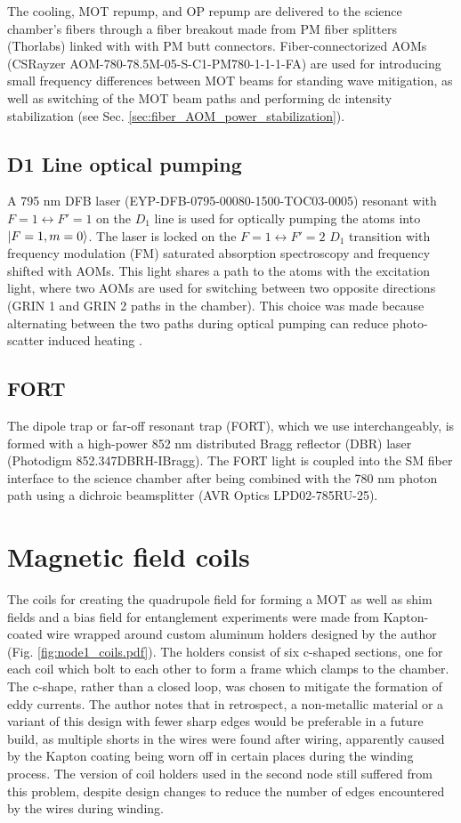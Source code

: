 The cooling, MOT repump, and OP repump are delivered to the science chamber's fibers through a fiber breakout made from PM fiber splitters (Thorlabs) linked with with PM butt connectors. Fiber-connectorized AOMs (CSRayzer AOM-780-78.5M-05-S-C1-PM780-1-1-1-FA) are used for introducing small frequency differences between MOT beams for standing wave mitigation, as well as switching of the MOT beam paths and performing dc intensity stabilization (see Sec. \ref{sec:fiber_AOM_power_stabilization}). 

\subsection{D1 Line optical pumping}

A 795 nm DFB laser (EYP-DFB-0795-00080-1500-TOC03-0005) resonant with $F=1 \leftrightarrow F'=1$ on the $D_1$ line is used for optically pumping the atoms into $\ket{F=1, m=0}$. The laser is locked on the $F=1 \leftrightarrow F'=2$ $D_1$ transition with frequency modulation (FM) saturated absorption spectroscopy and frequency shifted with AOMs. This light shares a path to the atoms with the excitation light, where two AOMs are used for switching between two opposite directions (GRIN 1 and GRIN 2 paths in the chamber). This choice was made  because alternating between the two paths during optical pumping can reduce photo-scatter induced heating \cite{su2024fast}.

\subsection{FORT}
The dipole trap or far-off resonant trap (FORT), which we use interchangeably, is formed with a high-power 852 nm distributed Bragg reflector (DBR) laser (Photodigm 852.347DBRH-IBragg). The FORT light is coupled into the SM fiber interface to the science chamber after being combined with the 780 nm photon path using a dichroic beamsplitter (AVR Optics LPD02-785RU-25).  

\section{Magnetic field coils}
The coils for creating the quadrupole field for forming a MOT as well as shim fields and a bias field for entanglement experiments were made from Kapton-coated wire wrapped around custom aluminum holders designed by the author (Fig. \ref{fig:node1_coils.pdf}). The holders consist of six c-shaped sections, one for each coil which bolt to each other to form a frame which clamps to the chamber. The c-shape, rather than a closed loop, was chosen to mitigate the formation of eddy currents. The author notes that in retrospect, a non-metallic material or a variant of this design with fewer sharp edges would be preferable in a future build, as multiple shorts in the wires were found after wiring, apparently caused by the Kapton coating being worn off in certain places during the winding process. The version of coil holders used in the second node still suffered from this problem, despite design changes to reduce the number of edges encountered by the wires during winding.

